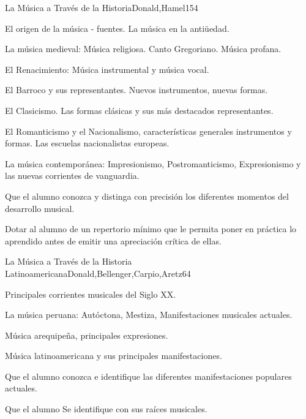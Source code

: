 \begin{syllabus}
\begin{unit}{La Música a Través de la Historia}{Donald,Hamel}{15}{4}
\begin{topics}
	\item El origen de la música - fuentes. La música en la antiüedad.
	\item La música medieval: Música religiosa.  Canto Gregoriano. Música profana.
	\item El Renacimiento: Música instrumental y música vocal.
	\item El Barroco y sus representantes. Nuevos instrumentos, nuevas formas.
	\item El Clasicismo. Las formas clásicas y sus más destacados representantes.
	\item El Romanticismo y el Nacionalismo, características generales instrumentos y formas. Las escuelas nacionalistas europeas.
	\item La música contemporánea: Impresionismo, Postromanticismo, Expresionismo y las nuevas corrientes de vanguardia.
\end{topics}
\begin{learningoutcomes}
	\item Que el alumno conozca y distinga con precisión los diferentes momentos del desarrollo musical.
	\item Dotar al alumno de un repertorio mínimo que le permita poner en práctica lo aprendido antes de emitir una apreciación crítica de ellas.
\end{learningoutcomes}
\end{unit}

\begin{unit}{La Música a Través de la Historia Latinoamericana}{Donald,Bellenger,Carpio,Aretz}{6}{4}
\begin{topics}
	\item Principales corrientes musicales del Siglo XX.
	\item La música peruana: Autóctona, Mestiza, Manifestaciones musicales actuales.
	\item Música arequipeña, principales expresiones.
	\item Música latinoamericana y sus principales manifestaciones.
\end{topics}
\begin{learningoutcomes}
	\item Que el alumno conozca e identifique las diferentes manifestaciones populares actuales. 
	\item Que el alumno Se identifique con sus raíces musicales.
\end{learningoutcomes}
\end{unit}



\begin{coursebibliography}
\end{coursebibliography}

\end{syllabus}
